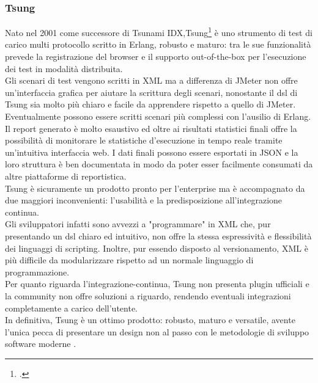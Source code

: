 \subsubsection{Tsung}
Nato nel 2001 come successore di Tsunami IDX,Tsung\footcite{site:tsung} è uno strumento di test di carico multi protocollo scritto in Erlang, robusto e maturo: tra le sue funzionalità prevede la registrazione del browser e il supporto \gls{out-of-the-box} per l'esecuzione dei test in modalità distribuita.\\
Gli scenari di test vengono scritti in XML ma a differenza di JMeter non offre un'interfaccia grafica per aiutare la scrittura degli scenari, nonostante il \gls{dsl} di Tsung sia molto più chiaro e facile da apprendere rispetto a quello di JMeter. Eventualmente possono essere scritti scenari più complessi con l'ausilio di Erlang. \\
Il report generato è molto esaustivo ed oltre ai risultati statistici finali offre la possibilità di monitorare le statistiche d'esecuzione in tempo reale tramite un'intuitiva interfaccia web. I dati finali possono essere esportati in JSON e la loro struttura è ben documentata in modo da poter esser facilmente consumati da altre piattaforme di reportistica.\\
Tsung è sicuramente un prodotto pronto per l'enterprise ma è accompagnato da due maggiori inconvenienti: l'usabilità e la predisposizione all'integrazione continua. \\
Gli sviluppatori infatti sono avvezzi a "programmare" in XML che, pur presentando un \gls{dsl} chiaro ed intuitivo, non offre la stessa espressività e flessibilità dei linguaggi di scripting. Inoltre, pur essendo disposto al versionamento, XML è più difficile da modularizzare rispetto ad un normale linguaggio di programmazione.\\
Per quanto riguarda l'\gls{integrazione-continua}, Tsung non presenta \gls{plugin} ufficiali e la community non offre soluzioni a riguardo, rendendo eventuali integrazioni completamente a carico dell'utente.\\
In definitiva, Tsung è un ottimo prodotto: robusto, maturo e versatile, avente l'unica pecca di presentare un design non al passo con le metodologie di sviluppo software moderne	. 
